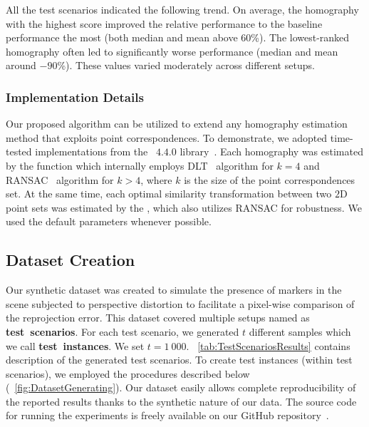 All the test scenarios indicated the following trend. On average, the homography with the highest score improved the relative performance to the baseline performance the most (both median and mean above $60$\%). The lowest-ranked homography often led to significantly worse performance (median and mean around $-90$\%). These values varied moderately across different setups.

\subsubsection{Implementation Details}
\label{sssec:HomographyImplementation}

Our proposed algorithm can be utilized to extend any homography estimation method that exploits point correspondences. To demonstrate, we adopted time-tested implementations from the \opencv{}~$4.4.0$ library~\cite{bradski2008learning}. Each homography was estimated by the  function which internally employs DLT~\cite{abdel2015direct} algorithm for $k = 4$ and RANSAC~\cite{fischler1981ransac} algorithm for $k > 4$, where $k$ is the size of the point correspondences set. At the same time, each optimal similarity transformation between two $2$D point sets was estimated by the , which also utilizes RANSAC for robustness. We used the default parameters whenever possible.

\subsection{Dataset Creation}
\label{ssec:HomographyDatasetCreation}

Our synthetic dataset was created to simulate the presence of markers in the scene subjected to perspective distortion to facilitate a pixel-wise comparison of the reprojection error. This dataset covered multiple setups named as \mbox{\textbf{test scenarios}}. For each test scenario, we generated $t$ different samples which we call \mbox{\textbf{test instances}}. We set $t = 1\ 000$. \tabletext{}~\ref{tab:TestScenariosResults} contains description of the generated test scenarios. To create test instances (within test scenarios), we employed the procedures described below (\figtext{}~\ref{fig:DatasetGenerating}). Our dataset easily allows complete reproducibility of the reported results thanks to the synthetic nature of our data. The source code for running the experiments is freely available on our GitHub repository~\cite{webhomographyrankinggithub}.

